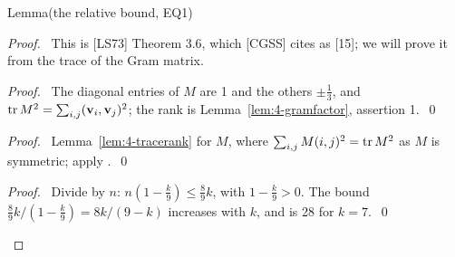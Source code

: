 \begin{namedresult}{Lemma}{(the relative bound, EQ1)}\label{lem:4-EQ1}
\end{namedresult}
\begin{proof}
 \pfsketch\ This is [LS73] Theorem 3.6, which [CGSS] cites as [15]; we will prove it from the
 trace of the Gram matrix.
 \begin{proof}\pf\ The diagonal entries of $M$ are 1 and the others $\pm\frac13$, and
  $\mathop{\mathrm{tr}}\nolimits M^2=\sum_{i,j}({\mathbf v}_i,{\mathbf v}_j)^2$; the rank is Lemma~\ref{lem:4-gramfactor},
  assertion 1.~\qed\end{proof}
 \begin{proof}\pf\ Lemma~\ref{lem:4-tracerank} for $M$, where
  $\sum_{i,j}M(i,j)^2=\mathop{\mathrm{tr}}\nolimits M^2$ as $M$ is symmetric; apply .~\qed\end{proof}
 \qedstep
 \begin{proof}\pf\ Divide  by $n$: $n(1-\frac k9)\le\frac89k$, with
  $1-\frac k9>0$. The bound $\frac89k/(1-\frac k9)=8k/(9-k)$ increases with $k$, and is 28 for
  $k=7$.~\qed\end{proof}
\end{proof}

